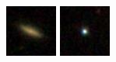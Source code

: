 \documentclass[
  11pt,
]{article}
\begin{document}
\begin{figure}
\centering
\begin{minipage}{0.8\textwidth}
\centering
\includegraphics[width=\linewidth]{./data/GALAXY/GALAXY_1.jpg}\hfill
\includegraphics[width=\linewidth]{./data/STAR/STAR_1.jpg}\hfill

\end{minipage}
\end{figure}
\end{document}
